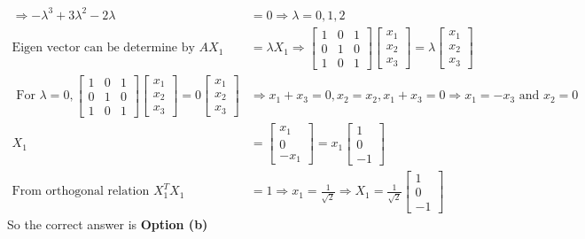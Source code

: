 \begin{enumerate}
\begin{answer}
\begin{align*}
		\Rightarrow-\lambda^{3}+3 \lambda^{2}-2 \lambda&=0 \Rightarrow \lambda=0,1,2\\
		\text{Eigen vector can be determine by }A X_{1}&=\lambda X_{1} \Rightarrow\left[\begin{array}{lll}1 & 0 & 1 \\ 0 & 1 & 0 \\ 1 & 0 & 1\end{array}\right]\left[\begin{array}{l}x_{1} \\ x_{2} \\ x_{3}\end{array}\right]=\lambda\left[\begin{array}{l}x_{1} \\ x_{2} \\ x_{3}\end{array}\right]\\
	\text{	For }\lambda=0,
		\left[\begin{array}{lll}
		1 & 0 & 1 \\
		0 & 1 & 0 \\
		1 & 0 & 1
		\end{array}\right]\left[\begin{array}{l}
		x_{1} \\
		x_{2} \\
		x_{3}
		\end{array}\right]=0\left[\begin{array}{l}
		x_{1} \\
		x_{2} \\
		x_{3}
		\end{array}\right]& \Rightarrow x_{1}+x_{3}=0, x_{2}=x_{2}, x_{1}+x_{3}=0 \Rightarrow x_{1}=-x_{3} \text { and } x_{2}=0\\
		X_{1}&=\left[\begin{array}{c}
		x_{1} \\
		0 \\
		-x_{1}
		\end{array}\right]=x_{1}\left[\begin{array}{c}
		1 \\
		0 \\
		-1
		\end{array}\right]\\
		\text{From orthogonal relation }X_{1}^{T} X_{1}&=1 \Rightarrow x_{1}=\frac{1}{\sqrt{2}} \Rightarrow X_{1}=\frac{1}{\sqrt{2}}\left[\begin{array}{c}1 \\ 0 \\ -1\end{array}\right]
		\end{align*}
		So the correct answer is \textbf{Option (b)}
	\end{answer}
	

\end{enumerate}
